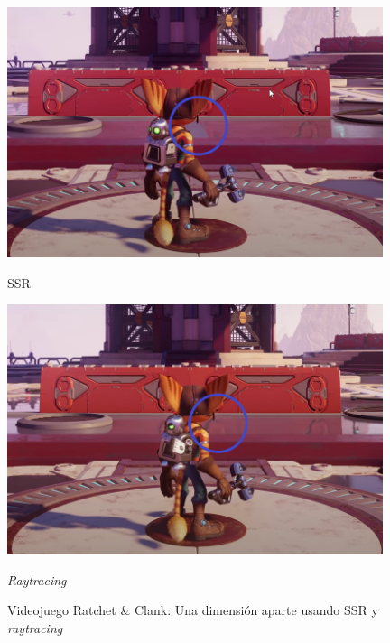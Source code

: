 \begin{figure}[!h]
     \begin{minipage}[c]{0.49\linewidth}
        \centering
        \includegraphics[width=0.98\textwidth]{Plantilla-TFG-master/img/ssr_on.png}
        \caption{SSR}
     \end{minipage}
     \begin{minipage}[c]{0.49\linewidth}
        \centering
        \includegraphics[width=0.98\textwidth]{Plantilla-TFG-master/img/ssr_off.png}
        \caption{\textit{Raytracing}}
     \end{minipage}
     \caption{Videojuego Ratchet \& Clank: Una dimensión aparte usando SSR y \textit{raytracing} \cite{ratchet}}
     \label{fig:ssrVS}
\end{figure}

